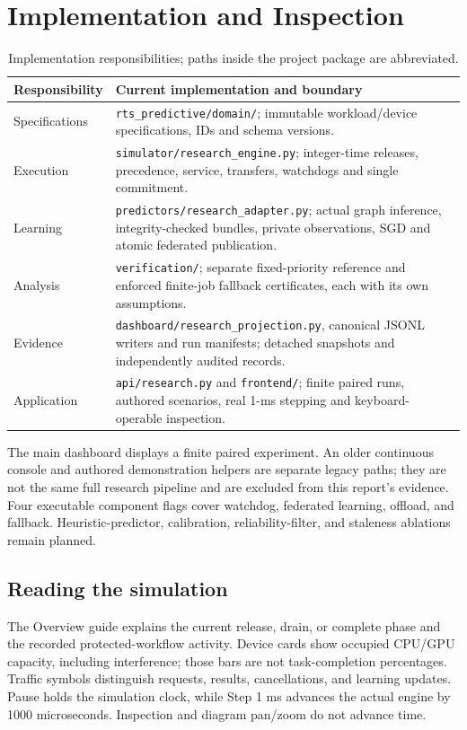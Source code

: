 \documentclass[11pt,a4paper]{article}
\newcommand{\code}[1]{\nolinkurl{#1}}
\begin{document}
\section{Implementation and Inspection}
\begin{table}[htbp]
\centering\small
\begin{tabularx}{\textwidth}{L{3.0cm}X}
\toprule Responsibility & Current implementation and boundary\\\midrule
Specifications & \code{rts_predictive/domain/}; immutable workload/device specifications, IDs and schema versions.\\
Execution & \code{simulator/research_engine.py}; integer-time releases, precedence, service, transfers, watchdogs and single commitment.\\
Learning & \code{predictors/research_adapter.py}; actual graph inference, integrity-checked bundles, private observations, SGD and atomic federated publication.\\
Analysis & \code{verification/}; separate fixed-priority reference and enforced finite-job fallback certificates, each with its own assumptions.\\
Evidence & \code{dashboard/research_projection.py}, canonical JSONL writers and run manifests; detached snapshots and independently audited records.\\
Application & \code{api/research.py} and \code{frontend/}; finite paired runs, authored scenarios, real 1-ms stepping and keyboard-operable inspection.\\
\bottomrule
\end{tabularx}
\caption{Implementation responsibilities; paths inside the project package are abbreviated.}
\end{table}

The main dashboard displays a finite paired experiment. An older continuous
console and authored demonstration helpers are separate legacy paths; they are
not the same full research pipeline and are excluded from this report's evidence.
Four executable component flags cover watchdog, federated learning, offload,
and fallback. Heuristic-predictor, calibration, reliability-filter, and staleness
ablations remain planned.

\subsection{Reading the simulation}
The Overview guide explains the current release, drain, or complete phase and
the recorded protected-workflow activity. Device cards show occupied CPU/GPU
capacity, including interference; those bars are not task-completion percentages.
Traffic symbols distinguish requests, results, cancellations, and learning updates.
Pause holds the simulation clock, while Step 1 ms advances the actual engine by
1000 microseconds. Inspection and diagram pan/zoom do not advance time.
\end{document}
